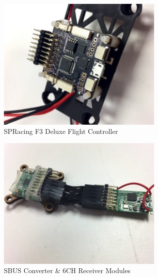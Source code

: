 \par
\begin{figure}[htbp]
\begin{subfigure}{0.5\textwidth}
\centering
\includegraphics[width=0.9\textwidth]{figs/f3-deluxe}
\caption{SPRacing F3 Deluxe Flight Controller}
\end{subfigure}
\begin{subfigure}{0.5\textwidth}
\centering
\includegraphics[width=0.9\textwidth]{figs/ppm-sbus}
\caption{SBUS Converter \& 6CH Receiver Modules}
\end{subfigure}
\caption{}
\end{figure}

